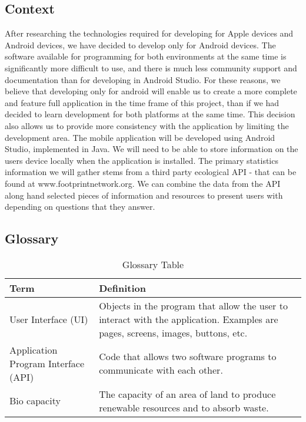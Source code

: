 \documentclass[onecolumn, draftclsnofoot,10pt, compsoc, tikz]{IEEEtran}
\begin{document}
\subsection{Context}
After researching the technologies required for developing for Apple devices and Android devices, we have decided to develop only for Android devices.
The software available for programming for both environments at the same time is significantly more difficult to use, and there is much less community support and documentation than for developing in Android Studio.
For these reasons, we believe that developing only for android will enable us to create a more complete and feature full application in the time frame of this project, than if we had decided to learn development for both platforms at the same time.
This decision also allows us to provide more consistency with the application by limiting the development area.
The mobile application will be developed using Android Studio, implemented in Java.
We will need to be able to store information on the users device locally when the application is installed.
The primary statistics information we will gather stems from a third party ecological API - that can be found at www.footprintnetwork.org. %
We can combine the data from the API along hand selected pieces of information and resources to present users with depending on questions that they answer. %

\clearpage
\subsection{Glossary}
\begin{table}[h!]
\caption{Glossary Table}
\begin{center}
\begin{tabular}{ | m{6em} | m{9cm}| }
    \hline Term & Definition \\
    \hline User Interface (UI) & Objects in the program that allow the user to interact with the application. Examples are pages, screens, images, buttons, etc. \\
    \hline Application Program Interface (API) & Code that allows two software programs to communicate with each other. \\
    \hline Bio capacity & The capacity of an area of land to produce renewable resources and to absorb waste. \\
    \hline
\end{tabular}
\end{center}
\end{table}
\end{document}
